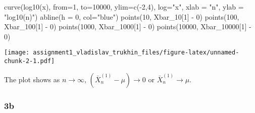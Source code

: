 \documentclass[
]{article}
\newenvironment{Shaded}{\begin{snugshade}}{\end{snugshade}}
\newcommand{\AttributeTok}[1]{\textcolor[rgb]{0.77,0.63,0.00}{#1}}
\newcommand{\DecValTok}[1]{\textcolor[rgb]{0.00,0.00,0.81}{#1}}
\newcommand{\FunctionTok}[1]{\textcolor[rgb]{0.00,0.00,0.00}{#1}}
\newcommand{\NormalTok}[1]{#1}
\newcommand{\SpecialCharTok}[1]{\textcolor[rgb]{0.00,0.00,0.00}{#1}}
\newcommand{\StringTok}[1]{\textcolor[rgb]{0.31,0.60,0.02}{#1}}
\begin{document}
\begin{Shaded}
\begin{Highlighting}[]
\FunctionTok{curve}\NormalTok{(}\FunctionTok{log10}\NormalTok{(x), }\AttributeTok{from=}\DecValTok{1}\NormalTok{, }\AttributeTok{to=}\DecValTok{10000}\NormalTok{, }\AttributeTok{ylim=}\FunctionTok{c}\NormalTok{(}\SpecialCharTok{{-}}\DecValTok{2}\NormalTok{,}\DecValTok{4}\NormalTok{), }\AttributeTok{log=}\StringTok{"x"}\NormalTok{, }\AttributeTok{xlab =} \StringTok{"n"}\NormalTok{, }\AttributeTok{ylab =} \StringTok{"log10(n)"}\NormalTok{)}
\FunctionTok{abline}\NormalTok{(}\AttributeTok{h =} \DecValTok{0}\NormalTok{, }\AttributeTok{col=}\StringTok{"blue"}\NormalTok{)}
\FunctionTok{points}\NormalTok{(}\DecValTok{10}\NormalTok{, Xbar\_10[}\DecValTok{1}\NormalTok{] }\SpecialCharTok{{-}} \DecValTok{0}\NormalTok{)}
\FunctionTok{points}\NormalTok{(}\DecValTok{100}\NormalTok{, Xbar\_100[}\DecValTok{1}\NormalTok{] }\SpecialCharTok{{-}} \DecValTok{0}\NormalTok{)}
\FunctionTok{points}\NormalTok{(}\DecValTok{1000}\NormalTok{, Xbar\_1000[}\DecValTok{1}\NormalTok{] }\SpecialCharTok{{-}} \DecValTok{0}\NormalTok{)}
\FunctionTok{points}\NormalTok{(}\DecValTok{10000}\NormalTok{, Xbar\_10000[}\DecValTok{1}\NormalTok{] }\SpecialCharTok{{-}} \DecValTok{0}\NormalTok{)}
\end{Highlighting}
\end{Shaded}

\texttt{[image: assignment1\_vladislav\_trukhin\_files/figure-latex/unnamed-chunk-2-1.pdf]}

The plot shows as \(n \rightarrow \infty\),
\((\bar{X}_n^{(1)} - \mu) \rightarrow 0\) or
\(\bar{X}_n^{(1)} \rightarrow \mu\).

\hypertarget{b-1}{%
\subsubsection{3b}\label{b-1}}
\end{document}
